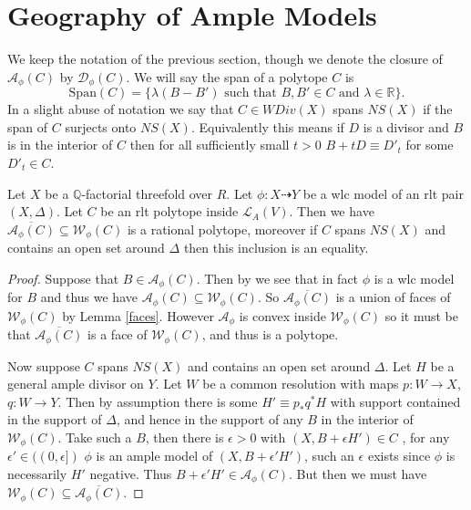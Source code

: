 	\section{Geography of Ample Models}
	
	We keep the notation of the previous section, though we denote the closure of $\mathcal{A}_{\phi}(C)$ by $\mathcal{D}_{\phi}(C)$. We will say the span of a polytope $C$ is $$\text{Span}(C)=\{\lambda(B-B') \text{ such that } B, B' \in C \text{ and } \lambda \in \mathbb{R}\}.$$  In a slight abuse of notation we say that $C \in WDiv(X)$ spans $NS(X)$ if the span of $C$ surjects onto $NS(X)$. Equivalently this means if $D$ is a divisor and $B$ is in the interior of $C$ then for all sufficiently small $t>0$ $B+tD\equiv D'_{t}$ for some $D'_{t}\in C$.
		
	\begin{lemma}\label{close}
		Let $X$ be a $\mathbb{Q}$-factorial threefold over $R$. Let $\phi:X \dashrightarrow Y$ be a wlc model of an rlt pair $(X,\Delta)$. Let $C$ be an rlt polytope inside $\mathcal{L}_{A}(V)$. Then we have $\overline{\mathcal{A}_{\phi}(C)} \subseteq \mathcal{W}_{\phi}(C)$ is a rational polytope, moreover if $C$ spans $NS(X)$ and contains an open set around $\Delta$ then this inclusion is an equality.
	\end{lemma}
	
	\begin{proof}
		Suppose that $B \in \mathcal{A}_{\phi}(C)$. Then by \cite[Theorem 3.6.5]{birkar2010existence} we see that in fact $\phi$ is a wlc model for $B$ and thus we have $\mathcal{A}_{\phi}(C) \subseteq \mathcal{W}_{\phi}(C)$. So $\overline{\mathcal{A}_{\phi}(C)}$ is a union of faces of $\mathcal{W}_{\phi}(C)$ by Lemma \ref{faces}. However $\mathcal{A}_{\phi}$ is convex inside $\mathcal{W}_{\phi}(C)$ so it must be that $\overline{\mathcal{A}_{\phi}(C)}$ is a face of $\mathcal{W}_{\phi}(C)$, and thus is a polytope.
		
		Now suppose $C$ spans $NS(X)$ and contains an open set around $\Delta$.
		Let $H$ be a general ample divisor on $Y$. Let $W$ be a common resolution with maps $p:W \to X$, $q:W \to Y$. Then by assumption there is some $H' \equiv p_{*}q^{*}H$ with support contained in the support of $\Delta$, and hence in the support of any $B$ in the interior of $\mathcal{W}_{\phi}(C)$. Take such a $B$, then there is $\epsilon >0$ with $(X,B+\epsilon H') \in C$ , for any $\epsilon' \in ((0,\epsilon])$ $\phi$ is an ample model of $(X,B+ \epsilon' H')$, such an $\epsilon$ exists since $\phi$ is necessarily $H'$ negative. Thus $B+\epsilon' H' \in \mathcal{A}_{\phi}(C)$. But then we must have $\mathcal{W}_{\phi}(C)\subseteq \overline{\mathcal{A}_{\phi}(C)}$.
	\end{proof}
	
